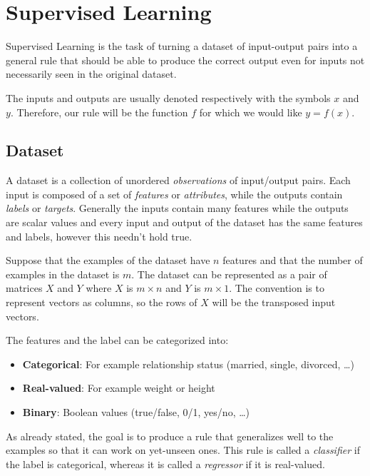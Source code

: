 \section{Supervised Learning}\label{sec:supervised-learning}

Supervised Learning is the task of turning a dataset of input-output
pairs into a general rule that should be able to produce the correct
output even for inputs not necessarily seen in the original dataset.

The inputs and outputs are usually denoted respectively with the
symbols \(x\) and \(y\).
Therefore, our rule will be the function \(f\) for which we would
like \(y = f(x)\).

\subsection{Dataset}
A dataset is a collection of unordered \textit{observations} of
input/output pairs.
Each input is composed of a set of \textit{features} or
\textit{attributes}, while the outputs contain \textit{labels}
or \textit{targets}.
Generally the inputs contain many features while the outputs are
scalar values and every input and output of the dataset has the same
features and labels,
however this needn't hold true.

Suppose that the examples of the dataset have \(n\) features and that
the number of examples in the dataset is \(m\). The dataset can be
represented as a pair of matrices \(X\) and \(Y\) where \(X\) is \(m
\times n\) and \(Y\) is \(m \times 1\). The convention is to
represent vectors as columns, so the rows of \(X\) will be the
transposed input vectors.

The features and the label can be categorized into:
\begin{itemize}
  \item \textbf{Categorical}: For example relationship status
    (married, single, divorced, \dots)
  \item \textbf{Real-valued}: For example weight or height
  \item \textbf{Binary}: Boolean values (true/false, 0/1, yes/no, \dots)
\end{itemize}

As already stated, the goal is to produce a rule that generalizes
well to the examples so that it can work on yet-unseen ones. This rule is called a
\textit{classifier} if the label is categorical, whereas it is called
a \textit{regressor} if it is real-valued.

